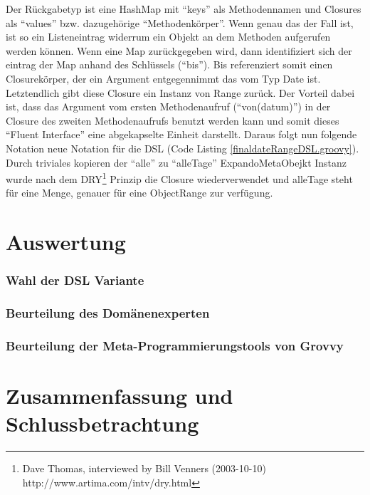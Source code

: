 \documentclass[11pt,english,ngerman, headsepline]{scrreprt}
\begin{document}
Der Rückgabetyp ist eine HashMap mit ``keys'' als Methodennamen und
Closures als ``values'' bzw. dazugehörige ``Methodenkörper''.
Wenn genau das der Fall ist, ist so ein Listeneintrag widerrum ein Objekt an dem
Methoden aufgerufen werden können. Wenn eine Map zurückgegeben wird, dann
identifiziert sich der eintrag der Map anhand des Schlüssels (``bis''). Bis
referenziert somit einen Closurekörper, der ein Argument entgegennimmt das vom
Typ Date ist. Letztendlich gibt diese Closure ein Instanz von Range zurück. Der
Vorteil dabei ist, dass das Argument vom ersten Methodenaufruf (``von(datum)'')
in der Closure des zweiten Methodenaufrufs benutzt werden kann und somit dieses
``Fluent Interface'' eine abgekapselte Einheit darstellt.
Daraus folgt nun folgende Notation neue Notation für die DSL (Code Listing
\ref{finaldateRangeDSL.groovy}).
Durch triviales kopieren der ``alle'' zu ``alleTage'' ExpandoMetaObejkt Instanz
wurde nach dem DRY\footnote{Dave Thomas, interviewed by Bill Venners
(2003-10-10) http://www.artima.com/intv/dry.html} Prinzip die Closure
wiederverwendet und alleTage steht für eine Menge, genauer für eine ObjectRange zur verfügung.


 








\chapter{Auswertung}

\subsection{Wahl der DSL Variante}

\subsection{Beurteilung des Domänenexperten}

\subsection{Beurteilung der Meta-Programmierungstools von Grovvy}
 
\chapter{Zusammenfassung und Schlussbetrachtung}
\end{document}
